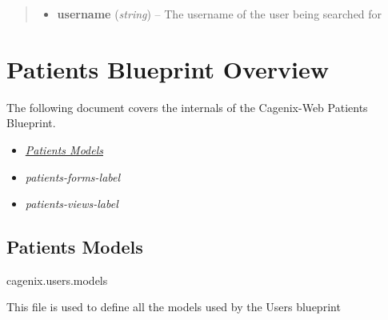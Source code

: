 \documentclass[letterpaper,10pt,english]{sphinxmanual}
\begin{document}
\begin{fulllineitems}
\begin{fulllineitems}
\begin{quote}
\begin{description}
\begin{itemize}
\item {} 
\textbf{username} (\emph{string}) -- The username of the user being searched for

\end{itemize}

\end{description}\end{quote}

\end{fulllineitems}


\end{fulllineitems}



\chapter{Patients Blueprint Overview}
\label{dev-patients::doc}\label{dev-patients:patients-blueprint-overview}
The following document covers the internals of the Cagenix-Web Patients
Blueprint.
\begin{itemize}
\item {} 
{\hyperref[dev-patients:patients-models-label]{\emph{Patients Models}}}

\item {} 
\emph{patients-forms-label}

\item {} 
\emph{patients-views-label}

\end{itemize}


\section{Patients Models}
\label{dev-patients:patients-models-label}\label{dev-patients:patients-models}\label{dev-patients:module-cagenix.patients.models}
cagenix.users.models

This file is used to define all the models used by the Users blueprint
\end{document}
